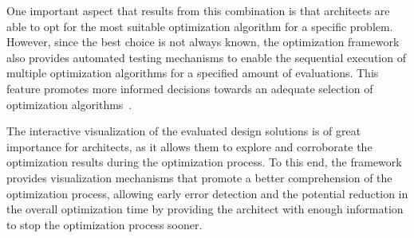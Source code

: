 One important aspect that results from this combination is that architects are able to opt for the most suitable optimization algorithm for a specific problem. However, since the best choice is not always known, the optimization framework also provides automated testing mechanisms to enable the sequential execution of multiple optimization algorithms for a specified amount of evaluations. This feature promotes more informed decisions towards an adequate selection of optimization algorithms~\cite{Wortmann2016BBO,Hamdy2016}.

The interactive visualization of the evaluated design solutions is of great importance for architects, as it allows them to explore and corroborate the optimization results during the optimization process. To this end, the framework provides visualization mechanisms that promote a better comprehension of the optimization process, allowing early error detection and the potential reduction in the overall optimization time by providing the architect with enough information to stop the optimization process sooner. 

